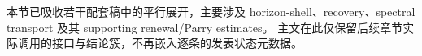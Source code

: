\documentclass[../../../main.tex]{subfiles}
\begin{document}

\begin{remark}
本节已吸收若干配套稿中的平行展开，主要涉及 horizon-shell、recovery、spectral transport 及其 supporting renewal/Parry estimates。
主文在此仅保留后续章节实际调用的接口与结论簇，不再嵌入逐条的发表状态元数据。
\end{remark}
\end{document}

